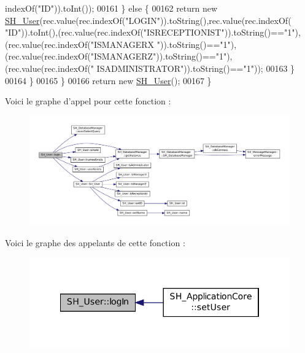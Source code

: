\begin{DoxyCode}
      indexOf(\textcolor{stringliteral}{"ID"})).toInt());
00161             \} \textcolor{keywordflow}{else} \{
00162                 \textcolor{keywordflow}{return} \textcolor{keyword}{new} \hyperlink{classSH__User_a96c0ebb3f11c1654935aaecb92295724}{SH\_User}(rec.value(rec.indexOf(\textcolor{stringliteral}{"LOGIN"})).toString(),rec.value(rec.indexOf(\textcolor{stringliteral}{
      "ID"})).toInt(),(rec.value(rec.indexOf(\textcolor{stringliteral}{"ISRECEPTIONIST"})).toString()==\textcolor{stringliteral}{"1"}),(rec.value(rec.indexOf(\textcolor{stringliteral}{"ISMANAGERX
      "})).toString()==\textcolor{stringliteral}{"1"}),(rec.value(rec.indexOf(\textcolor{stringliteral}{"ISMANAGERZ"})).toString()==\textcolor{stringliteral}{"1"}),(rec.value(rec.indexOf(\textcolor{stringliteral}{"
      ISADMINISTRATOR"})).toString()==\textcolor{stringliteral}{"1"}));
00163             \}
00164         \}
00165     \}
00166     \textcolor{keywordflow}{return} \textcolor{keyword}{new} \hyperlink{classSH__User_a96c0ebb3f11c1654935aaecb92295724}{SH\_User}();
00167 \}
\end{DoxyCode}


Voici le graphe d'appel pour cette fonction \-:
\nopagebreak
\begin{figure}[H]
\begin{center}
\leavevmode
\includegraphics[width=350pt]{classSH__User_ad83af309786cb1ed5dbbd2cdca195c30_cgraph}
\end{center}
\end{figure}




Voici le graphe des appelants de cette fonction \-:\nopagebreak
\begin{figure}[H]
\begin{center}
\leavevmode
\includegraphics[width=334pt]{classSH__User_ad83af309786cb1ed5dbbd2cdca195c30_icgraph}
\end{center}
\end{figure}



